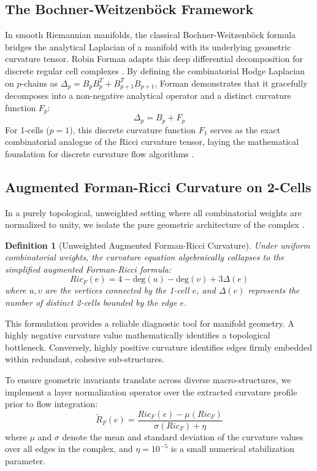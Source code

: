\documentclass[11pt, letterpaper]{article}
\newtheorem{definition}{Definition}[section]
\begin{document}
\subsection{The Bochner-Weitzenb\"ock Framework}
In smooth Riemannian manifolds, the classical Bochner-Weitzenb\"ock formula bridges the analytical Laplacian of a manifold with its underlying geometric curvature tensor. Robin Forman adapts this deep differential decomposition for discrete regular cell complexes \cite{forman_2003}. By defining the combinatorial Hodge Laplacian on $p$-chains as $\Delta_{p} = B_{p}B_{p}^{T} + B_{p+1}^{T}B_{p+1}$, Forman demonstrates that it gracefully decomposes into a non-negative analytical operator and a distinct curvature function $F_{p}$:
\begin{equation}
    \Delta_{p} = B_{p} + F_{p}
\end{equation}
For 1-cells ($p=1$), this discrete curvature function $F_{1}$ serves as the exact combinatorial analogue of the Ricci curvature tensor, laying the mathematical foundation for discrete curvature flow algorithms \cite{hamilton_ricci}.

\subsection{Augmented Forman-Ricci Curvature on 2-Cells}
In a purely topological, unweighted setting where all combinatorial weights are normalized to unity, we isolate the pure geometric architecture of the complex \cite{weber_curvature}.

\begin{definition}[Unweighted Augmented Forman-Ricci Curvature]
Under uniform combinatorial weights, the curvature equation algebraically collapses to the simplified augmented Forman-Ricci formula:
\begin{equation}
    Ric_{F}(e) = 4 - \text{deg}(u) - \text{deg}(v) + 3\Delta(e)
\end{equation}
where $u, v$ are the vertices connected by the 1-cell $e$, and $\Delta(e)$ represents the number of distinct 2-cells bounded by the edge $e$.
\end{definition}

This formulation provides a reliable diagnostic tool for manifold geometry. A highly negative curvature value mathematically identifies a topological bottleneck. Conversely, highly positive curvature identifies edges firmly embedded within redundant, cohesive sub-structures.

To ensure geometric invariants translate across diverse macro-structures, we implement a layer normalization operator over the extracted curvature profile prior to flow integration:
\begin{equation}
    \tilde{R}_F(e) = \frac{Ric_F(e) - \mu(Ric_F)}{\sigma(Ric_F) + \eta}
\end{equation}
where $\mu$ and $\sigma$ denote the mean and standard deviation of the curvature values over all edges in the complex, and $\eta = 10^{-5}$ is a small numerical stabilization parameter.
\end{document}
